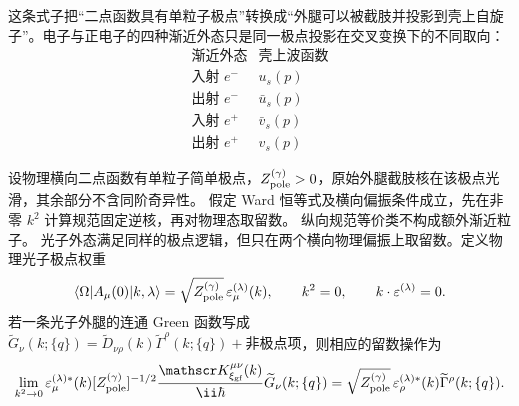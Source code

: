这条式子把“二点函数具有单粒子极点”转换成“外腿可以被截肢并投影到壳上自旋子”。电子与正电子的四种渐近外态只是同一极点投影在交叉变换下的不同取向：
\begin{equation}
 \begin{array}{c|c}
 \text{渐近外态} & \text{壳上波函数}\\
 \hline
 \text{入射 }e^- & u_s(p)\\
 \text{出射 }e^- & \bar u_s(p)\\
 \text{入射 }e^+ & \bar v_s(p)\\
 \text{出射 }e^+ & v_s(p)
 \end{array}
 \label{eq:external-dirac-spinor-table-dp8}
\end{equation}

\begin{proposition}
设物理横向二点函数有单粒子简单极点，$Z_{\rm pole}^{(\gamma)}>0$，原始外腿截肢核在该极点光滑，其余部分不含同阶奇异性。
假定 Ward 恒等式及横向偏振条件成立，先在非零 $k^2$ 计算规范固定逆核，再对物理态取留数。
纵向规范等价类不构成额外渐近粒子。
光子外态满足同样的极点逻辑，但只在两个横向物理偏振上取留数。定义物理光子极点权重
\begin{equation}
 \langle\Omega|A_\mu(0)|k,\lambda\rangle
 =\sqrt{Z_{\rm pole}^{(\gamma)}}\,\varepsilon_\mu^{(\lambda)}(k),
 \qquad
 k^2=0,
 \qquad
 k\cdot\varepsilon^{(\lambda)}=0.
 \label{eq:photon-field-pole-overlap-r68}
\end{equation}
若一条光子外腿的连通 Green 函数写成 $\widetilde G_\nu(k;\{q\})=\widetilde D_{\nu\rho}(k)\widetilde\Gamma^\rho(k;\{q\})+\text{非极点项}$，则相应的留数操作为
\begin{equation}
 {
 \lim_{k^2\to0}
 \varepsilon_\mu^{(\lambda)*}(k)[Z_{\rm pole}^{(\gamma)}]^{-1/2}
 \frac{\mathscr K_{\xi_{\rm gf}}^{\mu\nu}(k)}{\ii\hbar}
 \widetilde G_\nu(k;\{q\})
 =\sqrt{Z_{\rm pole}^{(\gamma)}}\,\varepsilon_\rho^{(\lambda)*}(k)\widetilde\Gamma^\rho(k;\{q\}).}
 \label{eq:photon-lsz-amputation-r68}
\end{equation}
\end{proposition}
